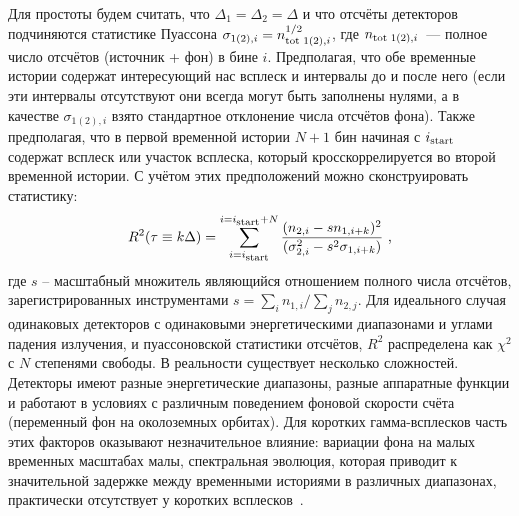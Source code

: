 Для простоты будем считать, что $\Delta_1 = \Delta_2 = \Delta$ и что отсчёты детекторов 
подчиняются статистике Пуассона $\sigma_{1(2),i} = n_{\mbox{\scriptsize tot }1(2), i}^{1/2}$, 
где $n_{\mbox{\scriptsize tot }1(2), i}$~--- полное число отсчётов (источник + фон) в бине $i$. 
Предполагая, что обе временные истории содержат интересующий нас всплеск и интервалы до и после него 
(если эти интервалы отсутствуют они всегда могут быть заполнены нулями, 
а в качестве $\sigma_{1(2),i}$ взято стандартное отклонение числа отсчётов фона).
Также предполагая, что в первой временной истории $N+1$ бин начиная 
с $i_{\mbox{\scriptsize start}}$ содержат всплеск или участок всплеска, 
который кросскоррелируется во второй временной истории. С учётом этих предположений 
можно сконструировать статистику:
\begin{equation}
R^2(\tau \equiv k\Delta) =  
\sum_{i=i_{\mbox{\scriptsize start}}}^{i=i_{\mbox{\scriptsize start}}+N} 
\frac{(n_{2,i} - s n_{1,i+k})^2}{(\sigma^2_{2,i} - s^2 \sigma_{1,i+k})} \mbox{ ,}
\end{equation}
где $s$ -- масштабный множитель являющийся отношением полного числа отсчётов, 
зарегистрированных инструментами $s = \sum_i n_{1,i} / \sum_j n_{2,j}$. 
Для идеального случая одинаковых детекторов с одинаковыми энергетическими диапазонами 
и углами падения излучения, и пуассоновской статистики отсчётов, $R^2$ распределена 
как $\chi^2$ с $N$ степенями свободы. В реальности существует несколько сложностей. 
Детекторы имеют разные энергетические диапазоны, разные аппаратные функции и работают 
в условиях с различным поведением фоновой скорости счёта (переменный фон на околоземных орбитах). 
Для коротких гамма-всплесков часть этих факторов оказывают незначительное влияние: 
вариации фона на малых временных масштабах малы, спектральная эволюция, которая 
приводит к значительной задержке между временными историями в различных диапазонах, 
практически отсутствует у коротких всплесков~\citep{Norris_2001grba}.


